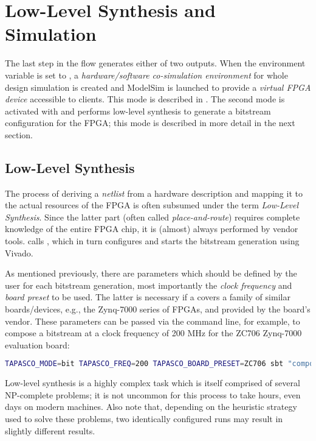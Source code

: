 \section{Low-Level Synthesis and Simulation}\label{sec:lls}%
The last step in the \tapasco{} flow generates either of two outputs.
When the environment variable  is set to , a \emph{hardware/software co-simulation environment} for whole design simulation is created and ModelSim is launched to provide a \emph{virtual FPGA device} accessible to  clients.
This mode is described in .
The second mode is activated with  and performs low-level synthesis to generate a bitstream configuration for the FPGA; this mode is described in more detail in the next section.

\subsection*{Low-Level Synthesis}\label{sec:lls-lls}
The process of deriving a \emph{netlist} from a hardware description and mapping it to the actual resources of the FPGA is often subsumed under the term \emph{Low-Level Synthesis}.
Since the latter part (often called \emph{place-and-route}) requires complete knowledge of the entire FPGA chip, it is (almost) always performed by vendor tools.
\tapasco{} calls , which in turn configures and starts the bitstream generation using Vivado.

\medskip
As mentioned previously, there are parameters which should be defined by the user for each bitstream generation, most importantly the \emph{clock frequency} and \emph{board preset} to be used.
The latter is necessary if a  covers a family of similar boards/devices, e.g., the Zynq-7000 series of FPGAs, and provided by the board's vendor.
These parameters can be passed via the command line, for example, to compose a bitstream at a clock frequency of 200 MHz for the ZC706 Zynq-7000 evaluation board:
%
\begin{lstlisting}[language=bash, morekeywords={TAPASCO_FREQ, TAPASCO_MODE, TAPASCO_BOARD_PRESET}]
TAPASCO_MODE=bit TAPASCO_FREQ=200 TAPASCO_BOARD_PRESET=ZC706 sbt "compose configFile ..."
\end{lstlisting}
%

\medskip
\begin{note}
Low-level synthesis is a highly complex task which is itself comprised of several NP-complete problems; it is not uncommon for this process to take hours, even days on modern machines.
Also note that, depending on the heuristic strategy used to solve these problems, two identically configured runs may result in slightly different results.
\end{note}

